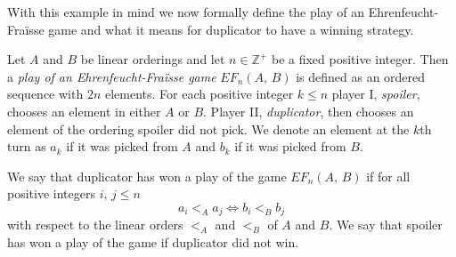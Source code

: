 \documentclass[../../main.tex]{subfiles}
\begin{document}
With this example in mind we now formally define the play of an Ehrenfeucht-Fra\"isse game and what it means for duplicator to have a winning strategy.

\begin{definition}\cite[Definition 6.2]{Ros82}
    Let $A$ and $B$ be linear orderings and let $n \in \mathbb{Z}^+$ be a fixed positive integer.
    Then a \textit{play of an Ehrenfeucht-Fra\"isse game} $EF_n(A,\, B)$ is defined as an ordered sequence with $2n$ elements.
    For each positive integer $k \leq n$ player I, \textit{spoiler}, chooses an element in either $A$ or $B$.
    Player II, \textit{duplicator}, then chooses an element of the ordering spoiler did not pick.
    We denote an element at the $k$th turn as $a_k$ if it was picked from $A$ and $b_k$ if it was picked from $B$.

    We say that duplicator has won a play of the game $EF_n(A,\, B)$ if for all positive integers $i,\, j \leq n$
    $$a_i <_A a_j \iff b_i <_B b_j$$
    with respect to the linear orders $<_A$ and $<_B$ of $A$ and $B$.
    We say that spoiler has won a play of the game if duplicator did not win.


\end{definition}
\end{document}

